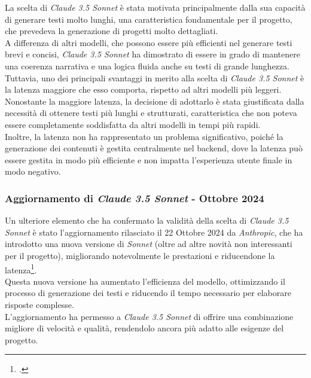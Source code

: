 \noindent La scelta di \textit{Claude 3.5 Sonnet} è stata motivata principalmente dalla sua capacità di generare testi molto lunghi, una caratteristica fondamentale per il progetto, che prevedeva la generazione di progetti molto dettagliati.\\
A differenza di altri modelli, che possono essere più efficienti nel generare testi brevi e concisi, \textit{Claude 3.5 Sonnet} ha dimostrato di essere in grado di mantenere una coerenza narrativa e una logica fluida anche su testi di grande lunghezza.\\

\noindent Tuttavia, uno dei principali svantaggi in merito alla scelta di \textit{Claude 3.5 Sonnet} è la latenza maggiore che esso comporta, rispetto ad altri modelli più leggeri.\\
Nonostante la maggiore latenza, la decisione di adottarlo è stata giustificata dalla necessità di ottenere testi più lunghi e strutturati, caratteristica che non poteva essere completamente soddisfatta da altri modelli in tempi più rapidi.\\
Inoltre, la latenza non ha rappresentato un problema significativo, poiché la generazione dei contenuti è gestita centralmente nel \gls{backend}, dove la latenza può essere gestita in modo più efficiente e non impatta l'esperienza utente finale in modo negativo.\\

\subsubsection{Aggiornamento di \textit{Claude 3.5 Sonnet} - Ottobre 2024}

Un ulteriore elemento che ha confermato la validità della scelta di \textit{Claude 3.5 Sonnet} è stato l'aggiornamento rilasciato il 22 Ottobre 2024 da \textit{Anthropic}, che ha introdotto una nuova versione di \textit{Sonnet} (oltre ad altre novità non interessanti per il progetto), 
migliorando notevolmente le prestazioni e riducendone la latenza\footcite{site:updated-sonnet}.\\

\noindent Questa nuova versione ha aumentato l'efficienza del modello, ottimizzando il processo di generazione dei testi e riducendo il tempo necessario per elaborare risposte complesse.\\
L'aggiornamento ha permesso a \textit{Claude 3.5 Sonnet} di offrire una combinazione migliore di velocità e qualità, rendendolo ancora più adatto alle esigenze del progetto.\\

